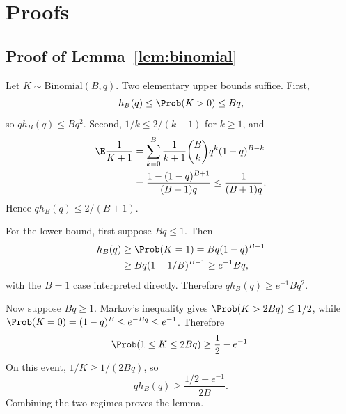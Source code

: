 \section{Proofs}
\label{app:proofs}

\subsection{Proof of Lemma~\ref{lem:binomial}}

Let $K\sim\mathrm{Binomial}(B,q)$. Two elementary upper bounds suffice. First,
\[
h_B(q)\le\Prob(K>0)\le Bq,
\]
so $qh_B(q)\le Bq^2$. Second, $1/k\le2/(k+1)$ for $k\ge1$, and
\begin{align}
\E\frac1{K+1}
&=\sum_{k=0}^B\frac1{k+1}\binom{B}{k}q^k(1-q)^{B-k}\\
&=\frac{1-(1-q)^{B+1}}{(B+1)q}
\le\frac1{(B+1)q}.
\end{align}
Hence $qh_B(q)\le2/(B+1)$.

For the lower bound, first suppose $Bq\le1$. Then
\begin{align}
h_B(q)
&\ge\Prob(K=1)
=Bq(1-q)^{B-1}\\
&\ge Bq(1-1/B)^{B-1}
\ge e^{-1}Bq,
\end{align}
with the $B=1$ case interpreted directly. Therefore
$qh_B(q)\ge e^{-1}Bq^2$.

Now suppose $Bq\ge1$. Markov's inequality gives
$\Prob(K>2Bq)\le1/2$, while
$\Prob(K=0)=(1-q)^B\le e^{-Bq}\le e^{-1}$. Therefore
\[
\Prob(1\le K\le2Bq)\ge\frac12-e^{-1}.
\]
On this event, $1/K\ge1/(2Bq)$, so
\[
qh_B(q)\ge\frac{1/2-e^{-1}}{2B}.
\]
Combining the two regimes proves the lemma.

